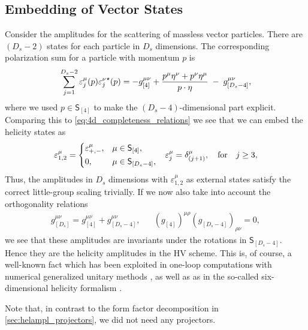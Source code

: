 \subsection{Embedding of Vector States}
\label{sec:embedding_vectors}
Consider the amplitudes for the scattering of massless vector particles.
There are $(D_s - 2)$ states for each particle in $D_s$ dimensions. 
The corresponding polarization sum for a particle with momentum $p$ is 
\begin{equation} \label{eq:vector_pol_sum_ds}
  \sum_{j=1}^{D_s-2} \varepsilon^\mu_j(p){\varepsilon^\nu_j}^{\star{}}(p) = -g_{[4]}^{\mu\nu} + \frac{p^\mu \eta^\nu + p^\nu \eta^\mu}{\sp(p,\eta)} \;-\; g_{[D_s-4]}^{\mu\nu}, 
\end{equation}
where we used $p \in \mathsf{S}_{[4]}$
to make the $(D_s-4)$-dimensional part explicit.
Comparing this to \cref{eq:4d_completeness_relations} we see that we can embed the helicity states as \cite{Kosower:1990ax}
\begin{align} \label{eq:embedding_vectors}
  \varepsilon_{1,2}^\mu =
    \begin{dcases}
      \varepsilon^\mu_{+,-}, & \mu\in \mathsf{S}_{[4]},\\
      0, & \mu\in \mathsf{S}_{[D_s-4]},\\
    \end{dcases}
    &&
  \varepsilon_{j}^\mu = \delta^\mu_{(j+1)}, \qfor j\geq 3,
\end{align}
Thus, the amplitudes in $D_s$ dimensions with $\varepsilon_{1,2}^\mu$ as external states satisfy the correct little-group scaling trivially.
If we now also take into account the orthogonality relations 
\begin{align}
  g_{[D_s]}^{\mu\nu} = g^{\mu\nu}_{[4]}+g^{\mu\nu}_{[D_s-4]}, && (g_{[4]})^{\mu\rho}(g_{[D_s-4]})_{\rho\nu} = 0,
\end{align}
we see that these amplitudes are invariants under the rotations in $\mathsf{S}_{[D_s-4]}$.
Hence they are the helicity amplitudes in the HV scheme.
This is, of course, a well-known fact which has been exploited in one-loop computations with numerical generalized
unitary methods \cite{Ellis:2007br,Giele:2008ve}, as well as as 
in the so-called six-dimensional helicity formalism \cite{Bern2011,Cheung:2009dc,Badger:2013gxa,Badger:2017jhb}.

Note that, in contrast to the form factor decomposition in \cref{sec:helampl_projectors}, we did not need any projectors.


